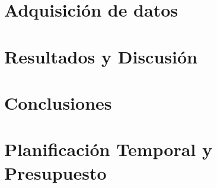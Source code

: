 \documentclass[a4paper,11pt,twoside]{report}
\begin{document}
\cleardoublepage
\chapter{Adquisición de datos}
\label{chap:data_acquisition}


\cleardoublepage
\chapter{Resultados y Discusión}


\cleardoublepage
\chapter{Conclusiones}


\cleardoublepage
\chapter{Planificación Temporal y Presupuesto}


\cleardoublepage
{}
\printbibliography
\end{document}
